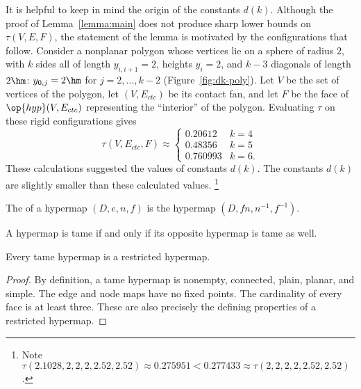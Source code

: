 \begin{remark}
  It is helpful to keep in mind the origin of the constants $d(k)$.
  Although the proof of Lemma~\ref{lemma:main} does not produce sharp
  lower bounds on $\tau(V,E,F)$, the statement of the lemma is
  motivated by the configurations that follow.  Consider a nonplanar
  polygon whose vertices lie on a sphere of radius $2$, with $k$ sides
  all of length $y_{i,i+1}=2$, heights $y_i=2$, and $k-3$ diagonals of
  length $2\hm$: $y_{0,j}=2\hm$ for $j=2,\ldots,k-2$
  (Figure~\ref{fig:dk-poly}).  Let $V$ be the set of vertices of the
  polygon, let $(V,E_{ctc})$ be its contact fan, and let $F$ be the
  face of $\op{hyp}(V,E_{ctc})$ representing the ``interior'' of the
  polygon.  Evaluating $\tau$ on these rigid configurations gives
\[ 
\tau(V,E_{ctc},F) \approx
\begin{cases}
0.20612 & k=4\\
0.48356 & k=5\\
0.760993 &k=6.
\end{cases}
\] 
These calculations suggested the values of constants $d(k)$.  The
constants $d(k)$ are slightly smaller than these calculated values.%
\footnote{Note $\tau(2.1028,2,2,2,2.52,2.52) \approx 0.275951 <
  0.277433 \approx \tau(2,2,2,2,2.52,2.52)$.}  
%
%
%
%
\end{remark}

\figDEJKNQK %

\begin{definition}[opposite]
The  of a hypermap $(D,e,n,f)$ is the
hypermap $(D,f n,n^{-1},f^{-1})$.
%
\end{definition}

\begin{lemma}[]
A hypermap is tame if and only if its opposite hypermap is tame as well.
\end{lemma}

\begin{lemma}[]\cutrate{}
Every tame hypermap is a restricted hypermap.
\end{lemma}

\begin{proof}
  By definition, a tame hypermap is nonempty, connected, plain,
  planar, and simple.  The edge and node maps
  have no fixed points.  The cardinality of every face is at least
  three.  These are also precisely the defining properties of a restricted
  hypermap.
\end{proof}




